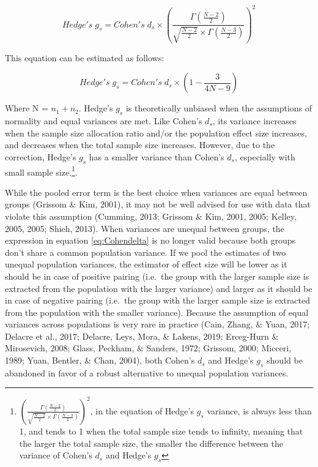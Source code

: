 \documentclass[
  man,floatsintext]{apa6}
\begin{document}
\begin{equation} 
Hedge's \; g_s = Cohen's \; d_s \times \left( \frac{\Gamma(\frac{N-2}{2})}{\sqrt{\frac{N-2}{2}} \times \Gamma(\frac{N-3}{2})} \right)^2
\label{eq:Hedgesgs}
\end{equation}

This equation can be estimated as follows:

\begin{equation} 
Hedge's \; g_s = Cohen's \; d_s \times \left( 1- \frac{3}{4N -9} \right)
\label{eq:Hedgesgsapprox}
\end{equation}

Where N = \(n_1+n_2\). Hedge's \(g_s\) is theoretically unbiased when the assumptions of normality and equal variances are met. Like Cohen's \(d_s\), its variance increases when the sample size allocation ratio and/or the population effect size increases, and decreases when the total sample size increases. However, due to the correction, Hedge's \(g_s\) has a smaller variance than Cohen's \(d_s\), especially with small sample size.\footnote{$\left(\frac{\Gamma(\frac{N-2}{2})}{\sqrt{\frac{N-2}{2}} \times \Gamma(\frac{N-3}{2})} \right)^2$, in the equation of Hedge's $g_s$ variance, is always less than 1, and tends to 1 when the total sample size tends to infinity, meaning that the larger the total sample size, the smaller the difference between the variance of Cohen's $d_s$ and Hedge's $g_s$}.

While the pooled error term is the best choice when variances are equal between groups (Grissom \& Kim, 2001), it may not be well advised for use with data that violate this assumption (Cumming, 2013; Grissom \& Kim, 2001, 2005; Kelley, 2005, 2005; Shieh, 2013). When variances are unequal between groups, the expression in equation \ref{eq:Cohendelta} is no longer valid because both groups don't share a common population variance. If we pool the estimates of two unequal population variances, the estimator of effect size will be lower as it should be in case of positive pairing (i.e.~the group with the larger sample size is extracted from the population with the larger variance) and larger as it should be in case of negative pairing (i.e.~the group with the larger sample size is extracted from the population with the smaller variance). Because the assumption of equal variances across populations is very rare in practice (Cain, Zhang, \& Yuan, 2017; Delacre et al., 2017; Delacre, Leys, Mora, \& Lakens, 2019; Erceg-Hurn \& Mirosevich, 2008; Glass, Peckham, \& Sanders, 1972; Grissom, 2000; Micceri, 1989; Yuan, Bentler, \& Chan, 2004), both Cohen's \(d_s\) and Hedge's \(g_s\) should be abandoned in favor of a robust alternative to unequal population variances.
\end{document}
